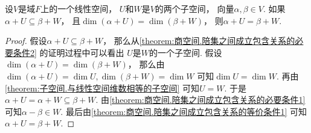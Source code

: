 \begin{theorem}
设\(V\)是域\(F\)上的一个线性空间，
\(U\)和\(W\)是\(V\)的两个子空间，
向量\(\alpha,\beta \in V\).
如果\(\alpha + U \subseteq \beta + W\)，
且\(\dim(\alpha + U) = \dim(\beta + W)\)，
则\(\alpha + U = \beta + W\).
\begin{proof}
假设\(\alpha + U \subseteq \beta + W\)，
那么从\cref{theorem:商空间.陪集之间成立包含关系的必要条件2} 的证明过程中可以看出
\(U\)是\(W\)的一个子空间.
假设\(\dim(\alpha + U) = \dim(\beta + W)\)，
那么由\(
	\dim(\alpha + U) = \dim U,
	\dim(\beta + W) = \dim W
\)
可知\(\dim U = \dim W\).
再由\cref{theorem:子空间.与线性空间维数相等的子空间}
可知\(U = W\).
于是\(\alpha + U = \alpha + W \subseteq \beta + W\).
由\cref{theorem:商空间.陪集之间成立包含关系的必要条件1}
可知\(\alpha - \beta \in W\).
最后由\cref{theorem:商空间.陪集之间成立包含关系的等价条件1}
可知\(\alpha + U = \beta + W\).
\end{proof}
\end{theorem}

